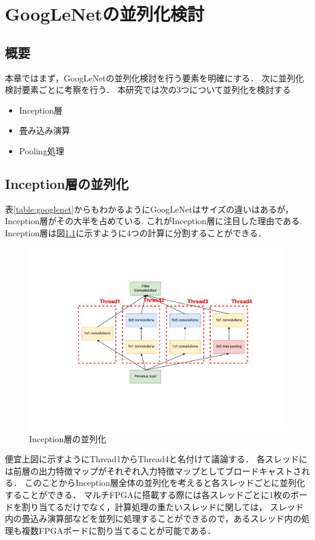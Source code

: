 \chapter{GoogLeNetの並列化検討}
{
\label{chap:parallel}

\section{概要}
本章ではまず，GoogLeNetの並列化検討を行う要素を明確にする．
次に並列化検討要素ごとに考察を行う．
本研究では次の3つについて並列化を検討する
\begin{itemize}
   \item Inception層 
   \item 畳み込み演算 
   \item Pooling処理 
\end{itemize}
\section{Inception層の並列化}
\label{sec:inception_para}
表\ref{table:googlenet}からもわかるようにGoogLeNetはサイズの違いはあるが，Inception層がその大半を占めている.
これがInception層に注目した理由である.
Inception層は図\ref{fig:para_inception}に示すように4つの計算に分割することができる．
\begin{figure}[h]
  \centering
  \includegraphics[width=12cm]{./chap5/fig/para_inception.pdf}
  \caption{Inception層の並列化}
  \label{fig:para_inception}
\end{figure}
便宜上図に示すようにThread1からThread4と名付けて議論する．
各スレッドには前層の出力特徴マップがそれぞれ入力特徴マップとしてブロードキャストされる．
このことからInception層全体の並列化を考えると各スレッドごとに並列化することができる．
マルチFPGAに搭載する際には各スレッドごとに1枚のボードを割り当てるだけでなく，計算処理の重たいスレッドに関しては，
スレッド内の畳込み演算部などを並列に処理することができるので，あるスレッド内の処理も複数FPGAボードに割り当てることが可能である．

}
